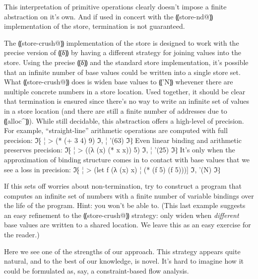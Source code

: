 This interpretation of primitive operations clearly doesn't impose a
finite abstraction on it's own.  And if used in concert with the
⸨store-nd@⸩ implementation of the store, termination is not
guaranteed.  

The ⸨store-crush@⸩ implementation of the store is designed to
work with the precise version of ⸨δ⸩ by having a different
strategy for joining values into the store.  Using the precise
⸨δ⸩ and the standard store implementation, it's possible that
an infinite number of base values could be written into a single store
set.  What ⸨store-crush@⸩ does is widen base values to
⸨'N⸩ whevener there are multiple concrete numbers in a store
location.  Used together, it should be clear that termination is
ensured since there's no way to write an infinite set of values in a
store location (and there are still a finite number of addresses due
to ⸨alloc^⸩).  While still decidable, this abstraction offers a
high-level of precision.  For example, ``straight-line'' arithmetic
operations are computed with full precision:
ℑ⁅
¦ > (* (+ 3 4) 9)
ℑ,
¦ '(63)
ℑ⁆
Even linear binding and arithmetic preserves precision:
ℑ⁅
¦ > ((λ (x) (* x x)) 5)
ℑ,
¦ '(25)
ℑ⁆
It's only when the approximation of binding structure comes in to
contact with base values that we see a loss in precision:
ℑ⁅
¦ > (let f (λ (x) x)
¦     (* (f 5) (f 5)))]
ℑ,
'(N)
ℑ⁆

If this sets off worries about non-termination, try to construct a
program that computes an infinite set of numbers with a finite number
of variable bindings over the life of the program.  Hint: you won't be
able to.  (This last example suggests an easy refinement to the
⸨store-crush@⸩ strategy: only widen when \emph{different} base
values are written to a shared location.  We leave this as an easy
exercise for the reader.)

Here we see one of the strengths of our approach.  This strategy
appears quite natural, and to the best of our knowledge, is novel.
It's hard to imagine how it could be formulated as, say, a
constraint-based flow analysis.
